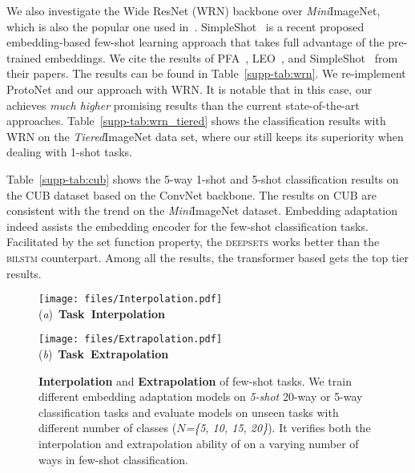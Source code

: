 We also investigate the Wide ResNet (WRN) backbone over {\it Mini}ImageNet, which is also the popular one used in~\cite{Qiao2017Few,Rusu2018Meta}. SimpleShot~\cite{Wang2019Simple} is a recent proposed embedding-based few-shot learning approach that takes full advantage of the pre-trained embeddings. We cite the results of PFA~\cite{Qiao2017Few}, LEO~\cite{Rusu2018Meta}, and SimpleShot~\cite{Wang2019Simple} from their papers.
The results can be found in Table~\ref{supp-tab:wrn}. We re-implement {ProtoNet} and our {\feat} approach with WRN. 
It is notable that in this case, our {\feat} achieves {\em much higher} promising results than the current state-of-the-art approaches. 
Table~\ref{supp-tab:wrn_tiered} shows the classification results with WRN on the {\it Tiered}ImageNet data set, where our {\feat} still keeps its superiority when dealing with 1-shot tasks.

Table~\ref{supp-tab:cub} shows the 5-way 1-shot and 5-shot classification results on the CUB dataset based on the ConvNet backbone. The results on CUB are consistent with the trend on the {\it Mini}ImageNet dataset. Embedding adaptation indeed assists the embedding encoder for the few-shot classification tasks. Facilitated by the set function property, the \textsc{deepsets} works better than the \textsc{bilstm} counterpart. Among all the results, the transformer based {\feat} gets the top tier results. 

\begin{figure}[!t]
	\small
	\centering
	\begin{minipage}[h]{4.1cm}
		\centering \texttt{[image: files/Interpolation.pdf]}\\
		\mbox{({\it a}) \textbf{Task Interpolation}}
	\end{minipage}
	\begin{minipage}[h]{4.1cm}
		\centering \texttt{[image: files/Extrapolation.pdf]}\\
		\mbox{({\it b}) \textbf{Task Extrapolation}}
	\end{minipage}
	\caption{\textbf{Interpolation} and \textbf{Extrapolation} of few-shot tasks. We train different embedding adaptation models on {\em 5-shot} 20-way or 5-way classification tasks and evaluate models on unseen tasks with different number of classes (\textit{$N$=\{5, 10, 15, 20\}}). It verifies both the interpolation and extrapolation ability of \feat on a varying number of ways in few-shot classification.}
	\label{supp-fig:changeN}
\end{figure}

